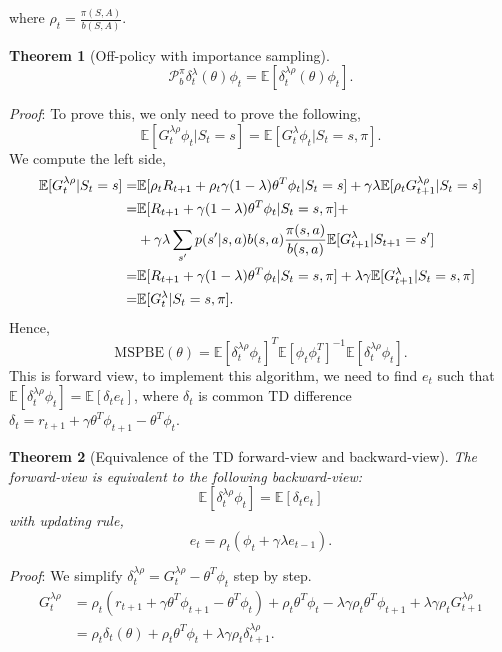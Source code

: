 \documentclass[11pt,a4paper]{article}
\def\P{{\mathcal P}}
\def\P{{\mathcal P}}
\def\E{\mathbb{E}}
\newtheorem{theorem}{Theorem}[subsection]
\begin{document}
where $\rho_t = \frac{\pi(S,A)}{b(S,A)}$.
\begin{theorem}[Off-policy with importance sampling]
\begin{equation}
\P_{b}^{\pi}\delta_t^\lambda(\theta) \phi_t = \E[\delta_t^{\lambda\rho}(\theta)\phi_t].
\end{equation}
\end{theorem}
\emph{Proof}:
To prove this, we only need to prove the following,
\begin{equation}
\E[G_t^{\lambda\rho}\phi_t|S_t=s] = \E[G_t^{\lambda}\phi_t|S_t=s,\pi].
\end{equation}
We compute the left side,
\begin{equation}
\aligned 
\E[G_t^{\lambda\rho}|S_t=s]  =& \E[\rho_t R_{t+1} + \rho_t\gamma(1-\lambda)\theta^T\phi_t|S_t=s] + \gamma\lambda \E[\rho_tG_{t+1}^{\lambda\rho}|S_t=s] \\ 
 =& \E[R_{t+1}+\gamma(1-\lambda)\theta^T\phi_t|S_t=s,\pi] + \\
 & + \gamma\lambda\sum_{s'}p(s'|s,a)b(s,a)\frac{\pi(s,a)}{b(s,a)}\E[G_{t+1}^{\lambda}|S_{t+1}=s'] \\ 
 = & \E[R_{t+1}+\gamma(1-\lambda)\theta^T\phi_t|S_t=s,\pi] + \lambda \gamma \E[G_{t+1}^{\lambda}|S_t=s,\pi] \\ 
 = & \E[G_{t}^\lambda|S_t=s,\pi].
\endaligned 
\end{equation}
Hence,
\begin{equation}
\mathrm{MSPBE}(\theta) = \E[\delta_t^{\lambda\rho}\phi_t]^T\E[\phi_t\phi_t^T]^{-1}\E[\delta_t^{\lambda\rho}\phi_t].
\end{equation}
This is forward view, to implement this algorithm, we need to find $e_t$ such that $\E[\delta_t^{\lambda\rho} \phi_t] = \E[\delta_t e_t]$, where $\delta_t$ is common TD difference $\delta_t = r_{t+1} + \gamma \theta^T\phi_{t+1}-\theta^T\phi_t$.
\begin{theorem}[Equivalence of the TD forward-view and backward-view] The forward-view is equivalent to the following backward-view:
\begin{equation}
\E[\delta_t^{\lambda\rho} \phi_t] = \E[\delta_t e_t]
\end{equation}
with updating rule,
\begin{equation}
e_t = \rho_t (\phi_t + \gamma\lambda e_{t-1}).
\end{equation}
\end{theorem}
\emph{Proof}:
We simplify $\delta_t^{\lambda\rho} = G_{t}^{\lambda\rho}-\theta^T\phi_t$ step by step.
\begin{align}
G_{t}^{\lambda\rho} & = \rho_t(r_{t+1}+\gamma \theta^T\phi_{t+1}-\theta^T\phi_t)+\rho_t\theta^T\phi_t - \lambda\gamma\rho_t\theta^T\phi_{t+1}+\lambda\gamma\rho_tG_{t+1}^{\lambda\rho} \\ 
& = \rho_t\delta_t(\theta)+\rho_t\theta^T\phi_t+\lambda\gamma\rho_t\delta_{t+1}^{\lambda\rho}. 
\end{align}
\end{document}
